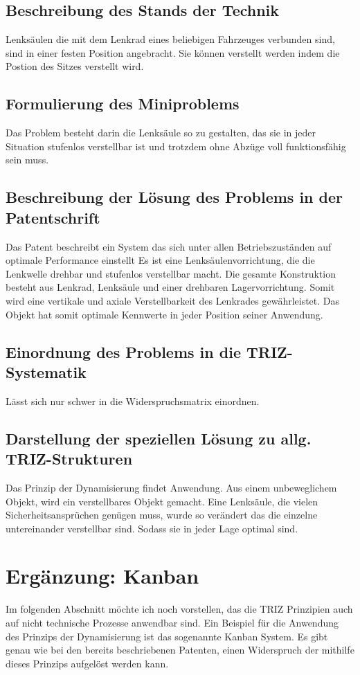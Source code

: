 \documentclass[11pt,a4paper]{article}
\begin{document}
\subsection{Beschreibung des Stands der Technik}
Lenksäulen die mit dem Lenkrad eines beliebigen Fahrzeuges verbunden sind,
sind in einer festen Position angebracht. Sie können verstellt werden indem
die Postion des Sitzes verstellt wird.
\subsection{Formulierung des Miniproblems}
Das Problem besteht darin die Lenksäule so zu gestalten, das sie in jeder
Situation stufenlos verstellbar ist und trotzdem ohne Abzüge voll
funktionsfähig sein muss.
\subsection{Beschreibung der Lösung des Problems in der Patentschrift}
Das Patent beschreibt ein System das sich unter allen Betriebszuständen auf
optimale Performance einstellt Es ist eine Lenksäulenvorrichtung, die die
Lenkwelle drehbar und stufenlos verstellbar macht.  Die gesamte Konstruktion
besteht aus Lenkrad, Lenksäule und einer drehbaren Lagervorrichtung.  Somit
wird eine vertikale und axiale Verstellbarkeit des Lenkrades gewährleistet.
Das Objekt hat somit optimale Kennwerte in jeder Position seiner Anwendung.
\subsection{Einordnung des Problems in die TRIZ-Systematik}
Lässt sich nur schwer in die Widerspruchsmatrix einordnen.
\subsection{Darstellung der speziellen Lösung zu allg. TRIZ-Strukturen}
Das Prinzip der Dynamisierung findet Anwendung. Aus einem unbeweglichem
Objekt, wird ein verstellbares Objekt gemacht. Eine Lenksäule, die vielen
Sicherheitsansprüchen genügen muss, wurde so verändert das die einzelne
untereinander verstellbar sind. Sodass sie in jeder Lage optimal sind.

\section{Ergänzung: Kanban}
Im folgenden Abschnitt möchte ich noch vorstellen, das die TRIZ Prinzipien
auch auf nicht technische Prozesse anwendbar sind. Ein Beispiel für die
Anwendung des Prinzips der Dynamisierung ist das sogenannte Kanban System.  Es
gibt genau wie bei den bereits beschriebenen Patenten, einen Widerspruch der
mithilfe dieses Prinzips aufgelöst werden kann.
\end{document}
